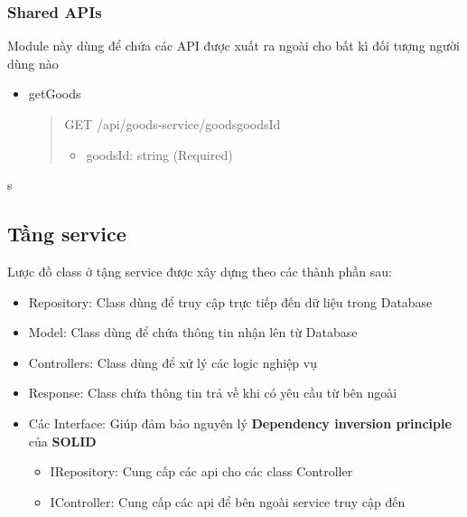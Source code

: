 \subsubsection{Shared APIs}
Module này dùng để chứa các API được xuất ra ngoài cho bất kì đối tượng người dùng nào

\begin{itemize}
	\item getGoods
	\begin{quote}
		GET /api/goods-service/goods{goodsId}
		\begin{itemize}
			\item goodsId: string (Required)
		\end{itemize}
	\end{quote}
\end{itemize}

s



\subsection{Tầng service}

Lược đồ class ở tậng service được xây dựng theo các thành phần sau:
\begin{itemize}
	\item Repository: Class dùng để truy cập trực tiếp đến dữ liệu trong Database
	\item Model: Class dùng để chứa thông tin nhận lên từ Database
	\item Controllers: Class dùng để xử lý các logic nghiệp vụ
	\item Response: Class chứa thông tin trả về khi có yêu cầu từ bên ngoài
	\item Các Interface: Giúp đảm bảo nguyên lý \textbf{Dependency inversion principle} của \textbf{SOLID}
	      \begin {itemize}
	\item IRepository: Cung cấp các api cho các class Controller
	\item IController: Cung cấp các api để bên ngoài service truy cập đến
\end{itemize}
\end{itemize}



